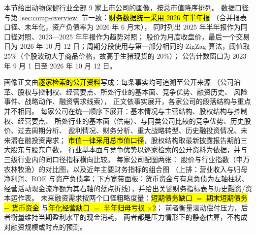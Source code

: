 本节给出动物保健行业全部 \num{9} 家上市公司的画像，按总市值降序排列。
数据口径与第 \ref{sec:comp-overview} 节一致：\hl{财务数据统一采用 2026 年半年报}
（合并报表口径、未年化，资产负债率为 2026 年 6 月末），
同时列出 2025 年半年报作为同口径对照、2023---2025 年年报作为趋势对照；
股价为月度收盘价，最后一个交易日为 2026 年 10 月 12 日；周期分段使用与第一部分相同的
ZigZag 算法，阈值取 25\%（个股波动大于商品价格，故高于生猪现货的 20\%）；
公告计数窗口为 2023 年 9 月 1 日至 2026 年 10 月 12 日。

画像正文由\hl{逐家检索的公开资料}写成：每条事实均可追溯至公开来源
（公司沿革、股权与控制权、经营要点、所处行业的基本面、竞争优势、融资历史、
风险事件、战略动作、融资需求线索），
正文依事实展开，各家公司的段落结构与重点并不相同。
每家公司在统一顺序下展开：基本情况与主营结构、股权结构与控制权、经营要点、
所处行业的基本面（供需）、与同类公司比较的竞争优势、历史股价、过去周期分析、
盈利情况、财务分析、重大战略转型、历史融投资情况、未来潜在融投资需求；
\hl{市值一律采用总市值口径}，股权结构取最新披露报告期前三大股东与股东户数，
行业基本面与竞争优势以逐家检索的公开资料为依据，并与三级行业内的同口径指标横向比较。
每家公司配图两张：
股价与行业指数（申万农林牧渔）的对比图，以及近年主要财务指标的组合图
（上排：营业收入与归母净利润、ROE 与资产负债率；下方宽带面板：货币资金与有息负债为左轴柱状、
经营活动现金流净额为其右轴的蓝点折线），并给出关键财务指标表与历史融资/资本运作表。
未来融资需求按两个口径粗略度量：\hl{短期债务缺口 $=$ 期末短期债务 $-$ 货币资金}
与\hl{年化经营缺口 $=$ 半年归母亏损 $\times 2$}；
前者衡量滚动偿付压力，后者衡量维持当期盈利水平的现金消耗，
两者都是压力情形下的静态估算，不构成对融资规模或时点的预测。


